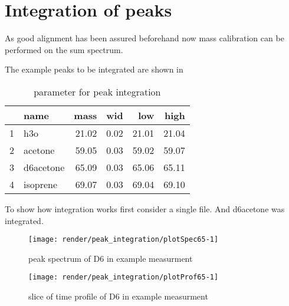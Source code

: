 \section{Integration of peaks}

As good alignment has been assured beforehand now mass calibration can be performed on the sum spectrum.







The example peaks to be integrated are shown in 

\begin{table}[ht]
\centering
\begin{tabular}{rlrrrr}
  \hline
 & name & mass & wid & low & high \\ 
  \hline
1 & h3o & 21.02 & 0.02 & 21.01 & 21.04 \\ 
  2 & acetone & 59.05 & 0.03 & 59.02 & 59.07 \\ 
  3 & d6acetone & 65.09 & 0.03 & 65.06 & 65.11 \\ 
  4 & isoprene & 69.07 & 0.03 & 69.04 & 69.10 \\ 
   \hline
\end{tabular}
\caption{parameter for peak integration} 
\label{tab:integrpeaks}
\end{table}






To show how integration works first consider a single file.
And d6acetone was integrated.

\begin{figure}
\texttt{[image: render/peak\_integration/plotSpec65-1]} \caption[peak spectrum of D6 in example measurment]{peak spectrum of D6 in example measurment}\label{fig:plotSpec65}
\end{figure}



\begin{kframe}


{\ttfamily\noindent\bfseries\color{errorcolor}{\#\# Error in plot.window(...): endliche 'ylim' Werte nötig}}\end{kframe}\begin{figure}
\texttt{[image: render/peak\_integration/plotProf65-1]} \caption[slice of time profile of D6 in example measurment]{slice of time profile of D6 in example measurment}\label{fig:plotProf65}
\end{figure}


